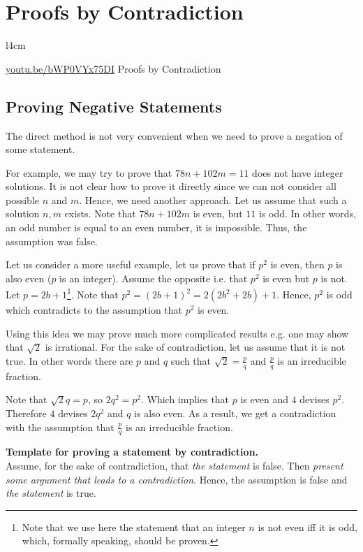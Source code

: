 \chapter{Proofs by Contradiction}
\begin{wrapfigure}{l}{4cm}
  \begin{center}
    \vskip -0.5cm
    \vskip 0.25cm
    \href{https://youtu.be/bWP0VYx75DI}{youtu.be/bWP0VYx75DI}
    {\footnotesize Proofs by Contradiction}
  \end{center}
  \vskip -0.5cm
\end{wrapfigure}
\section{Proving Negative Statements}
The direct method is not very convenient when we need to prove a negation of
some statement.

For example, we may try to prove that $78 n + 102 m = 11$ does not have integer
solutions. It is not clear how to prove it directly since we can not consider
all possible $n$ and $m$. Hence, we need another approach. Let us assume that
such a solution $n, m$ exists. Note that $78 n + 102 m$ is even, but $11$ is
odd. In other words, an odd number is equal to an even number, it is impossible.
Thus, the assumption was false.

Let us consider a more useful example, let us prove that if $p^2$ is even, then
$p$ is also even ($p$ is an integer). Assume the opposite i.e. that $p^2$ is
even but $p$ is not. Let $p = 2b + 1$\footnote{Note that we use here the
statement that an integer $n$ is not even iff it is odd, which, formally
speaking, should be proven.}. Note that $p^2 = (2b + 1)^2 = 2(2b^2 + 2b) + 1$.
Hence, $p^2$ is odd which contradicts to the assumption that $p^2$ is even.

Using this idea we may prove much more complicated results e.g. one may show
that $\sqrt{2}$ is irrational. For the sake of contradiction, let us assume
that it is not true. In other words there are $p$ and $q$ such that
$\sqrt{2} = \frac{p}{q}$ and $\frac{p}{q}$ is an irreducible fraction.

Note that $\sqrt{2} q = p$, so $2q^2 = p^2$. Which implies that $p$ is even
and $4$ devises $p^2$. Therefore $4$ devises $2q^2$ and $q$ is also even. As
a result, we get a contradiction with the assumption that $\frac{p}{q}$ is an
irreducible fraction.

\begin{template}
  \textbf{Template for proving a statement by contradiction.} \\

  Assume, for the sake of contradiction, that \textit{the statement} is false.
  Then \textit{present some argument that leads to a contradiction}. Hence, the
  assumption is false and \textit{the statement} is true.
\end{template}

